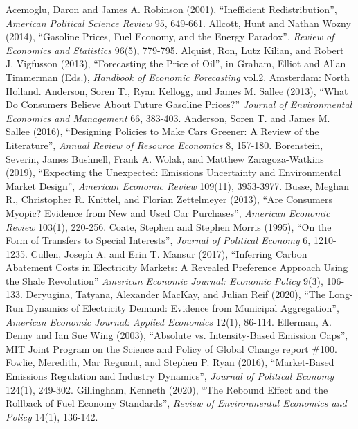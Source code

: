 \documentclass[12pt]{article}
\begin{document}
\begin{thebibliography}{99}

\bibitem{} Acemoglu, Daron and James A. Robinson (2001), ``Inefficient Redistribution'', {\it American Political Science Review} 95, 649-661.
\bibitem{} Allcott, Hunt and Nathan Wozny (2014), ``Gasoline Prices, Fuel Economy, and the Energy Paradox'', {\it Review of Economics and Statistics} 96(5), 779-795.
\bibitem{} Alquist, Ron, Lutz Kilian, and Robert J. Vigfusson (2013), ``Forecasting the Price of Oil'', in Graham, Elliot and Allan Timmerman (Eds.), {\it Handbook of Economic Forecasting} vol.2. Amsterdam: North Holland.
\bibitem{} Anderson, Soren T., Ryan Kellogg, and James M. Sallee (2013), ``What Do Consumers Believe About Future Gasoline Prices?'' {\it Journal of Environmental Economics and Management} 66, 383-403.
\bibitem{} Anderson, Soren T. and James M. Sallee (2016), ``Designing Policies to Make Cars Greener: A Review of the Literature'', {\it Annual Review of Resource Economics} 8, 157-180.
\bibitem{} Borenstein, Severin, James Bushnell, Frank A. Wolak, and Matthew Zaragoza-Watkins (2019), ``Expecting the Unexpected: Emissions Uncertainty and Environmental Market Design'', {\it American Economic Review} 109(11), 3953-3977.
\bibitem{} Busse, Meghan R., Christopher R. Knittel, and Florian Zettelmeyer (2013), ``Are Consumers Myopic? Evidence from New and Used Car Purchases'', {\it American Economic Review} 103(1), 220-256.
\bibitem{} Coate, Stephen and Stephen Morris (1995), ``On the Form of Transfers to Special Interests'', {\it Journal of Political Economy} 6, 1210-1235.
\bibitem{} Cullen, Joseph A. and Erin T. Mansur (2017), ``Inferring Carbon Abatement Costs in Electricity Markets: A Revealed Preference Approach Using the Shale Revolution'' {\it American Economic Journal: Economic Policy} 9(3), 106-133.
\bibitem{} Deryugina, Tatyana, Alexander MacKay, and Julian Reif (2020), ``The Long-Run Dynamics of Electricity Demand: Evidence from Municipal Aggregation'', {\it American Economic Journal: Applied Economics} 12(1), 86-114.
\bibitem{} Ellerman, A. Denny and Ian Sue Wing (2003), ``Absolute vs. Intensity-Based Emission Caps'', MIT Joint Program on the Science and Policy of Global Change report \#100.
\bibitem{} Fowlie, Meredith, Mar Reguant, and Stephen P. Ryan (2016), ``Market-Based Emissions Regulation and Industry Dynamics'', {\it Journal of Political Economy} 124(1), 249-302.
\bibitem{} Gillingham, Kenneth (2020), ``The Rebound Effect and the Rollback of Fuel Economy Standards'',  {\it Review of Environmental Economics and Policy} 14(1), 136-142.

\end{thebibliography}
\end{document}
